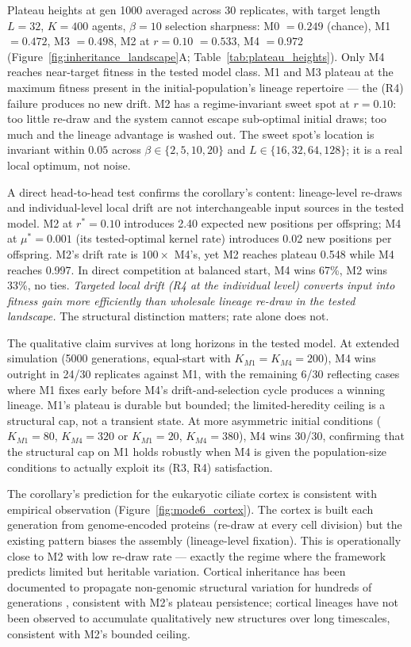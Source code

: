 \documentclass[aps,prx,reprint,amsmath,amssymb,floatfix,superscriptaddress,nofootinbib]{revtex4-2}
\theoremstyle{plain-thm}
\theoremstyle{definition-thm}
\begin{document}
Plateau heights at gen 1000 averaged across 30 replicates, with target length $L = 32$, $K = 400$ agents, $\beta = 10$ selection sharpness: M0 $= 0.249$ (chance), M1 $= 0.472$, M3 $= 0.498$, M2 at $r = 0.10$ $= 0.533$, M4 $= 0.972$ (Figure~\ref{fig:inheritance_landscape}A; Table~\ref{tab:plateau_heights}). Only M4 reaches near-target fitness in the tested model class. M1 and M3 plateau at the maximum fitness present in the initial-population's lineage repertoire --- the (R4) failure produces no new drift. M2 has a regime-invariant sweet spot at $r = 0.10$: too little re-draw and the system cannot escape sub-optimal initial draws; too much and the lineage advantage is washed out. The sweet spot's location is invariant within $0.05$ across $\beta \in \{2, 5, 10, 20\}$ and $L \in \{16, 32, 64, 128\}$; it is a real local optimum, not noise.

A direct head-to-head test confirms the corollary's content: lineage-level re-draws and individual-level local drift are not interchangeable input sources in the tested model. M2 at $r^* = 0.10$ introduces 2.40 expected new positions per offspring; M4 at $\mu^* = 0.001$ (its tested-optimal kernel rate) introduces 0.02 new positions per offspring. M2's drift rate is $100\times$ M4's, yet M2 reaches plateau 0.548 while M4 reaches 0.997. In direct competition at balanced start, M4 wins 67\%, M2 wins 33\%, no ties. \textit{Targeted local drift (R4 at the individual level) converts input into fitness gain more efficiently than wholesale lineage re-draw in the tested landscape.} The structural distinction matters; rate alone does not.

The qualitative claim survives at long horizons in the tested model. At extended simulation (5000 generations, equal-start with $K_{M1} = K_{M4} = 200$), M4 wins outright in 24/30 replicates against M1, with the remaining 6/30 reflecting cases where M1 fixes early before M4's drift-and-selection cycle produces a winning lineage. M1's plateau is durable but bounded; the limited-heredity ceiling is a structural cap, not a transient state. At more asymmetric initial conditions ($K_{M1} = 80$, $K_{M4} = 320$ or $K_{M1} = 20$, $K_{M4} = 380$), M4 wins 30/30, confirming that the structural cap on M1 holds robustly when M4 is given the population-size conditions to actually exploit its (R3, R4) satisfaction.

The corollary's prediction for the eukaryotic ciliate cortex is consistent with empirical observation (Figure~\ref{fig:mode6_cortex}). The cortex is built each generation from genome-encoded proteins (re-draw at every cell division) but the existing pattern biases the assembly (lineage-level fixation). This is operationally close to M2 with low re-draw rate --- exactly the regime where the framework predicts limited but heritable variation. Cortical inheritance has been documented to propagate non-genomic structural variation for hundreds of generations \citep{BeissonSonneborn1965}, consistent with M2's plateau persistence; cortical lineages have not been observed to accumulate qualitatively new structures over long timescales, consistent with M2's bounded ceiling.
\end{document}
